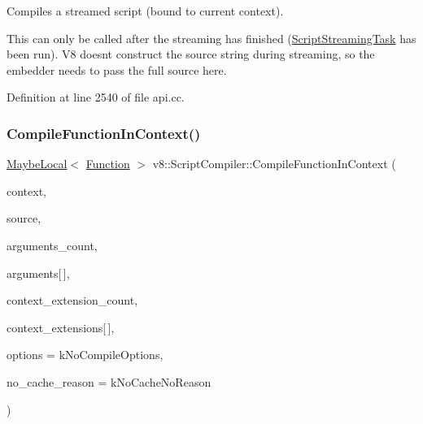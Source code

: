 Compiles a streamed script (bound to current context).

This can only be called after the streaming has finished (\mbox{\hyperlink{classv8_1_1ScriptCompiler_1_1ScriptStreamingTask}{Script\+Streaming\+Task}} has been run). V8 doesn\textquotesingle{}t construct the source string during streaming, so the embedder needs to pass the full source here. 

Definition at line 2540 of file api.\+cc.

\mbox{\label{classv8_1_1ScriptCompiler_a376bcde3d0271797d06b672c9c5cf98d}} 
\subsubsection{\texorpdfstring{Compile\+Function\+In\+Context()}{CompileFunctionInContext()}}
{\footnotesize\ttfamily \mbox{\hyperlink{classv8_1_1MaybeLocal}{Maybe\+Local}}$<$ \mbox{\hyperlink{classv8_1_1Function}{Function}} $>$ v8\+::\+Script\+Compiler\+::\+Compile\+Function\+In\+Context (\begin{DoxyParamCaption}\item[{\mbox{\hyperlink{classv8_1_1Local}{Local}}$<$ Context $>$}]{context,  }\item[{\mbox{\hyperlink{classv8_1_1ScriptCompiler_1_1Source}{Source}} $\ast$}]{source,  }\item[{\mbox{\hyperlink{classsize__t}{size\+\_\+t}}}]{arguments\+\_\+count,  }\item[{\mbox{\hyperlink{classv8_1_1Local}{Local}}$<$ \mbox{\hyperlink{classv8_1_1String}{String}} $>$}]{arguments\mbox{[}$\,$\mbox{]},  }\item[{\mbox{\hyperlink{classsize__t}{size\+\_\+t}}}]{context\+\_\+extension\+\_\+count,  }\item[{\mbox{\hyperlink{classv8_1_1Local}{Local}}$<$ \mbox{\hyperlink{classv8_1_1Object}{Object}} $>$}]{context\+\_\+extensions\mbox{[}$\,$\mbox{]},  }\item[{Compile\+Options}]{options = {\ttfamily kNoCompileOptions},  }\item[{\mbox{\hyperlink{classv8_1_1ScriptCompiler_a7f13fa15484cfc500ae51927756e0d60}{No\+Cache\+Reason}}}]{no\+\_\+cache\+\_\+reason = {\ttfamily kNoCacheNoReason} }\end{DoxyParamCaption})\hspace{0.3cm}{\ttfamily [static]}}

